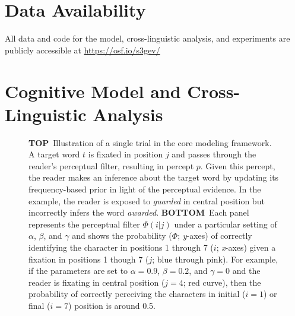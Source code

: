 \documentclass[doc,biblatex,floatsintext]{apa7}
\begin{document}
\section{Data Availability}

All data and code for the model, cross-linguistic analysis, and experiments are publicly accessible at \url{https://osf.io/s3gev/}

\section{Cognitive Model and Cross-Linguistic Analysis}

\begin{figure}
\vspace*{2pt}
\caption{\textbf{TOP}~Illustration of a single trial in the core modeling framework. A target word $t$ is fixated in position $j$ and passes through the reader's perceptual filter, resulting in percept $p$. Given this percept, the reader makes an inference about the target word by updating its frequency-based prior in light of the perceptual evidence. In the example, the reader is exposed to \textit{guarded} in central position but incorrectly infers the word \textit{awarded}. \textbf{BOTTOM}~Each panel represents the perceptual filter $\Phi(i|j)$ under a particular setting of $\alpha$, $\beta$, and $\gamma$ and shows the probability ($\Phi$; \textit{y}-axes) of correctly identifying the character in positions 1 through 7 ($i$; \textit{x}-axes) given a fixation in positions 1 though 7 ($j$; blue through pink). For example, if the parameters are set to $\alpha=0.9$, $\beta=0.2$, and $\gamma=0$ and the reader is fixating in central position ($j=4$; red curve), then the probability of correctly perceiving the characters in initial ($i=1$) or final ($i=7$) position is around 0.5.}
\label{fig01}
\end{figure}
\end{document}
